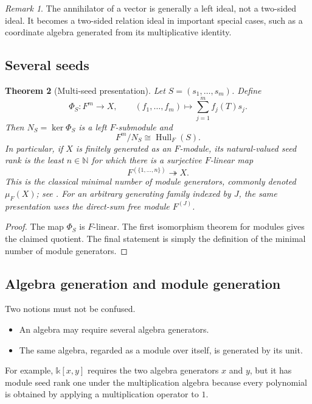 \documentclass[11pt]{article}
\newtheorem{theorem}{Theorem}[section]
\theoremstyle{definition}
\theoremstyle{remark}
\newtheorem{remark}[theorem]{Remark}
\newcommand{\Hull}{\operatorname{Hull}}
\newcommand{\bbk}{\mathbb{k}}
\newcommand{\N}{\mathbb N}
\begin{document}
\begin{remark}
The annihilator of a vector is generally a left ideal, not a two-sided ideal. It becomes a two-sided relation ideal in important special cases, such as a coordinate algebra generated from its multiplicative identity.
\end{remark}

\subsection{Several seeds}

\begin{theorem}[Multi-seed presentation]
\label{thm:multi-seed-presentation}
Let $S=(s_1,\ldots,s_m)$. Define
\[
\Phi_S:F^m\longrightarrow X,
\qquad
(f_1,\ldots,f_m)\longmapsto\sum_{j=1}^m f_j(T)s_j.
\]
Then $N_S=\ker\Phi_S$ is a left $F$-submodule and
\[
\boxed{
F^m/N_S\cong\Hull_F(S).
}
\]
In particular, if $X$ is finitely generated as an $F$-module, its natural-valued seed rank is the least $n\in\N$ for which there is a surjective $F$-linear map
\[
F^{(\{1,\ldots,n\})}\twoheadrightarrow X.
\]
This is the classical minimal number of module generators, commonly denoted $\mu_F(X)$; see \cite[Ch.~1]{lam1999modules}. For an arbitrary generating family indexed by $J$, the same presentation uses the direct-sum free module $F^{(J)}$.
\end{theorem}

\begin{proof}
The map $\Phi_S$ is $F$-linear. The first isomorphism theorem for modules gives the claimed quotient. The final statement is simply the definition of the minimal number of module generators.
\end{proof}

\subsection{Algebra generation and module generation}

Two notions must not be confused.

\begin{itemize}
\item An algebra may require several algebra generators.
\item The same algebra, regarded as a module over itself, is generated by its unit.
\end{itemize}

For example, $\bbk[x,y]$ requires the two algebra generators $x$ and $y$, but it has module seed rank one under the multiplication algebra because every polynomial is obtained by applying a multiplication operator to $1$.
\end{document}
